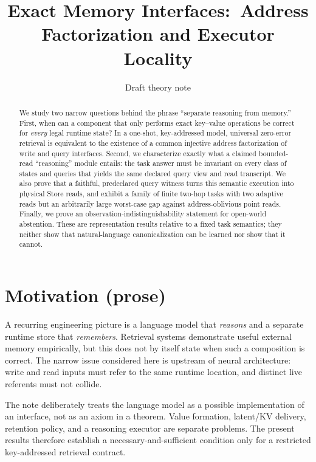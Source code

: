 \documentclass[11pt]{article}
\title{Exact Memory Interfaces:\
Address Factorization and Executor Locality}
\author{Draft theory note}
\date{}
\theoremstyle{definition}
\theoremstyle{plain}
\begin{document}
\maketitle

\begin{abstract}
We study two narrow questions behind the phrase ``separate reasoning from
memory.''  First, when can a component that only performs exact key--value
operations be correct for \emph{every} legal runtime state?  In a one-shot,
key-addressed model, universal zero-error retrieval is equivalent to the
existence of a common injective address factorization of write and query
interfaces.  Second, we characterize exactly what a claimed bounded-read
``reasoning'' module entails: the task answer must be invariant on every
class of states and queries that yields the same declared query view and read
transcript.  We also prove that a faithful, predeclared query witness turns
this semantic execution into physical Store reads, and exhibit a family of
finite two-hop tasks with two adaptive reads but an arbitrarily large
worst-case gap against address-oblivious point reads.  Finally, we prove an
observation-indistinguishability statement for open-world abstention.  These
are representation results relative to a fixed task semantics; they neither
show that natural-language canonicalization can be learned nor show that it
cannot.
\end{abstract}

\section{Motivation (prose)}

A recurring engineering picture is a language model that \emph{reasons} and a
separate runtime store that \emph{remembers}.  Retrieval systems demonstrate
useful external memory empirically, but this does not by itself state when
such a composition is correct.  The narrow issue considered here is upstream
of neural architecture: write and read inputs must refer to the same runtime
location, and distinct live referents must not collide.

The note deliberately treats the language model as a possible implementation
of an interface, not as an axiom in a theorem.  Value formation, latent/KV
delivery, retention policy, and a reasoning executor are separate problems.
The present results therefore establish a necessary-and-sufficient condition
only for a restricted key-addressed retrieval contract.
\end{document}
